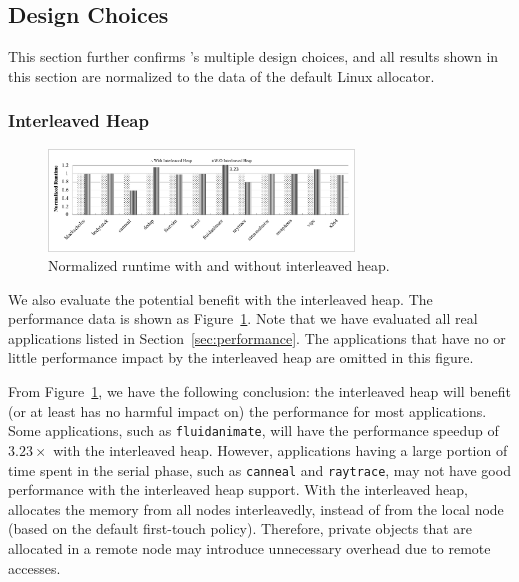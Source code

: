 \subsection{Design Choices}
\label{sec:design}

This section further confirms \NM{}'s multiple design choices, and all results shown in this section are normalized to the data of the default Linux allocator.  




\subsubsection{Interleaved Heap} 
\label{sec:interleavedheap}

\begin{figure}[!h]
    \centering
    \includegraphics[width=3.2in]{figure/interleavedheap.pdf}
    \caption{Normalized runtime with and without  interleaved heap.\label{fig:interleavedheap}}  
\end{figure}

We also evaluate the potential benefit with the  interleaved heap. The performance data is shown as Figure~\ref{fig:interleavedheap}. Note that we have evaluated all real applications listed in Section~\ref{sec:performance}. The applications that have no or little performance impact by the interleaved heap are omitted in this figure. 

From Figure~\ref{fig:interleavedheap}, we have the following conclusion: the interleaved heap will benefit (or at least has no harmful impact on) the performance for most applications. Some applications, such as \texttt{fluidanimate}, will have the performance speedup of $3.23\times$ with the interleaved heap. However, applications having a large portion of time spent in the serial phase, such as \texttt{canneal} and \texttt{raytrace}, may not have good performance with the interleaved heap support. With the interleaved heap, \NM{} allocates the memory from all nodes interleavedly, instead of from the local node (based on the default first-touch policy). Therefore, private objects that are allocated in a remote node may introduce unnecessary overhead due to remote accesses.
 
